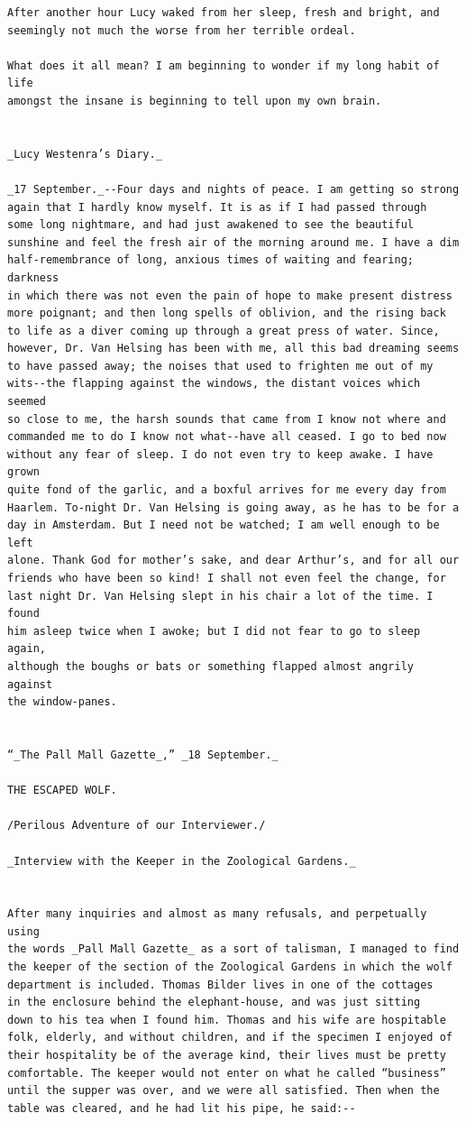 \documentclass{article}
\begin{document}
\begin{verbatim}
After another hour Lucy waked from her sleep, fresh and bright, and
seemingly not much the worse from her terrible ordeal.

What does it all mean? I am beginning to wonder if my long habit of life
amongst the insane is beginning to tell upon my own brain.


_Lucy Westenra’s Diary._

_17 September._--Four days and nights of peace. I am getting so strong
again that I hardly know myself. It is as if I had passed through
some long nightmare, and had just awakened to see the beautiful
sunshine and feel the fresh air of the morning around me. I have a dim
half-remembrance of long, anxious times of waiting and fearing; darkness
in which there was not even the pain of hope to make present distress
more poignant; and then long spells of oblivion, and the rising back
to life as a diver coming up through a great press of water. Since,
however, Dr. Van Helsing has been with me, all this bad dreaming seems
to have passed away; the noises that used to frighten me out of my
wits--the flapping against the windows, the distant voices which seemed
so close to me, the harsh sounds that came from I know not where and
commanded me to do I know not what--have all ceased. I go to bed now
without any fear of sleep. I do not even try to keep awake. I have grown
quite fond of the garlic, and a boxful arrives for me every day from
Haarlem. To-night Dr. Van Helsing is going away, as he has to be for a
day in Amsterdam. But I need not be watched; I am well enough to be left
alone. Thank God for mother’s sake, and dear Arthur’s, and for all our
friends who have been so kind! I shall not even feel the change, for
last night Dr. Van Helsing slept in his chair a lot of the time. I found
him asleep twice when I awoke; but I did not fear to go to sleep again,
although the boughs or bats or something flapped almost angrily against
the window-panes.


“_The Pall Mall Gazette_,” _18 September._

THE ESCAPED WOLF.

/Perilous Adventure of our Interviewer./

_Interview with the Keeper in the Zoological Gardens._


After many inquiries and almost as many refusals, and perpetually using
the words _Pall Mall Gazette_ as a sort of talisman, I managed to find
the keeper of the section of the Zoological Gardens in which the wolf
department is included. Thomas Bilder lives in one of the cottages
in the enclosure behind the elephant-house, and was just sitting
down to his tea when I found him. Thomas and his wife are hospitable
folk, elderly, and without children, and if the specimen I enjoyed of
their hospitality be of the average kind, their lives must be pretty
comfortable. The keeper would not enter on what he called “business”
until the supper was over, and we were all satisfied. Then when the
table was cleared, and he had lit his pipe, he said:--


\end{verbatim}
\end{document}
